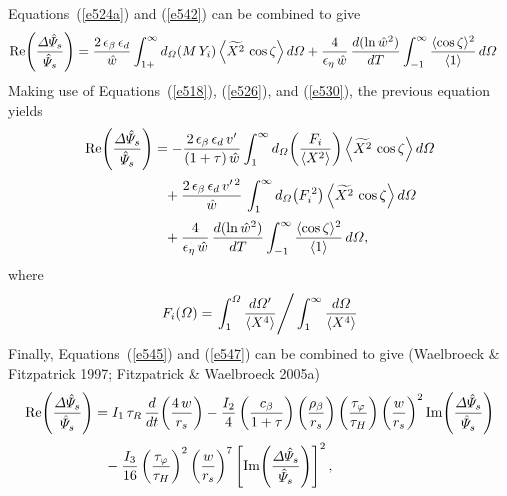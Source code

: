 \documentclass[notitlepage,12pt]{article}
\begin{document}
Equations~(\ref{e524a}) and (\ref{e542}) can be combined to give
\begin{align}
{\rm Re}\!\left(\frac{{\mit\Delta}\hat{\mit\Psi}_s}{\hat{\mit\Psi}_s}\right)&= \frac{2\,\epsilon_\beta\,\epsilon_d}{\hat{w}}
\int_{1+}^\infty d_{\mit\Omega}(M\,Y_i)\left\langle\widetilde{X^2}\,\cos\zeta\right\rangle d{\mit\Omega}
+\frac{4}{\epsilon_\eta\,\hat{w}}\,\frac{d(\ln \hat{w}^2)}{dT}\int_{-1}^\infty \frac{\langle \cos\zeta\rangle^2}{\langle 1\rangle}\,d{\mit\Omega}
\end{align}
Making use of Equations~(\ref{e518}), (\ref{e526}), and (\ref{e530}), the previous equation yields
\begin{align}
{\rm Re}\!\left(\frac{{\mit\Delta}\hat{\mit\Psi}_s}{\hat{\mit\Psi}_s}\right)&= -\frac{2\,\epsilon_\beta\,\epsilon_d\,v'}{(1+\tau)\,\hat{w}}
\int_1^\infty d_{\mit\Omega}\!\left(\frac{F_i}{\langle X^2\rangle}\right)\left\langle\widetilde{X^2}\,\cos\zeta\right\rangle d{\mit\Omega}
\nonumber\\[0.5ex]
&\phantom{=}+ \frac{2\,\epsilon_\beta\,\epsilon_d\,v'^{\,2}}{\hat{w}} \,\int_1^\infty d_{\mit\Omega}\!\left(F_i^{\,2}\right)\left\langle\widetilde{X^2}\,\cos\zeta\right\rangle d{\mit\Omega}\nonumber\\[0.5ex]
&\phantom{=}+\frac{4}{\epsilon_\eta\,\hat{w}}\,\frac{d(\ln \hat{w}^2)}{dT}\int_{-1}^\infty \frac{\langle \cos\zeta\rangle^2}{\langle 1\rangle}\,d{\mit\Omega},\label{e547}
\end{align}
where
\begin{equation}
F_i({\mit\Omega})=\left.\int_1^{\mit\Omega}\frac{d{\mit\Omega}'}{\langle X^4\rangle}\right/\int_1^\infty\frac{d{\mit\Omega}}{\langle X^4\rangle}
\end{equation}
Finally, Equations~(\ref{e545}) and (\ref{e547})
can be combined to give (Waelbroeck \& Fitzpatrick 1997; Fitzpatrick \& Waelbroeck 2005a)
\begin{align}\label{e559}
{\rm Re}\!\left(\frac{{\mit\Delta}\hat{\mit\Psi}_s}{\hat{\mit\Psi}_s}\right)&= I_1\,\tau_R\,\frac{d}{dt}\!\left(\frac{4\,w}{r_s}\right)
- \frac{I_2}{4}\left(\frac{c_\beta}{1+\tau}\right)\left(\frac{\rho_\beta}{r_s}\right)\left(\frac{\tau_\varphi}{\tau_H}\right)\left(\frac{w}{r_s}\right)^2 {\rm Im}\!\left(\frac{{\mit\Delta}\hat{\mit\Psi}_s}{\hat{\mit\Psi}_s}\right)\nonumber\\[0.5ex]
&\phantom{=} -\frac{I_3}{16}\left(\frac{\tau_\varphi}{\tau_H}\right)^2 \left(\frac{w}{r_s}\right)^7\left[{\rm Im}\!\left(\frac{{\mit\Delta}\hat{\mit\Psi}_s}{\hat{\mit\Psi}_s}\right)\right]^2, 
\end{align}
\end{document}

